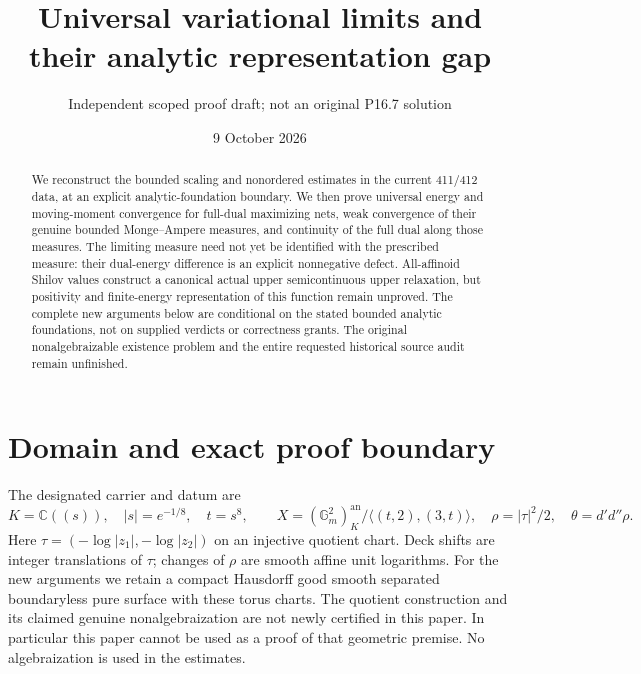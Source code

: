 \documentclass[11pt]{article}
\title{Universal variational limits and their analytic representation gap}
\author{Independent scoped proof draft; not an original P16.7 solution}
\date{9 October 2026}
\newcommand{\DD}{d'd''}
\begin{document}
\maketitle
\begin{abstract}
We reconstruct the bounded scaling and nonordered estimates in the current
411/412 data, at an explicit analytic-foundation boundary. We then prove
universal energy and moving-moment convergence for full-dual maximizing
nets, weak convergence of their genuine bounded Monge--Ampere measures,
and continuity of the full dual along those measures. The limiting measure
need not yet be identified with the prescribed measure: their dual-energy
difference is an explicit nonnegative defect. All-affinoid Shilov values
construct a canonical actual upper semicontinuous upper relaxation, but
positivity and finite-energy representation of this function remain
unproved. The complete new arguments below are conditional on the stated
bounded analytic foundations, not on supplied verdicts or correctness grants.
The original nonalgebraizable existence problem and the entire requested
historical source audit remain unfinished.
\end{abstract}

\section{Domain and exact proof boundary}
The designated carrier and datum are
\[
 K=\mathbb C((s)),\quad |s|=e^{-1/8},\quad t=s^8,\qquad
 X=(\mathbb G_m^2)^{\mathrm{an}}_K/\langle(t,2),(3,t)\rangle,
 \quad \rho=|\tau|^2/2,\quad\theta=\DD\rho.
\]
Here $\tau=(-\log|z_1|,-\log|z_2|)$ on an injective quotient
chart. Deck shifts are integer translations of $\tau$; changes of
$\rho$ are smooth affine unit logarithms. For the new arguments we
retain a compact Hausdorff good smooth separated boundaryless pure
surface with these torus charts. The quotient construction and its
claimed genuine nonalgebraization are not newly certified in this paper.
In particular this paper cannot be used as a proof of that geometric
premise. No algebraization is used in the estimates.
\end{document}
